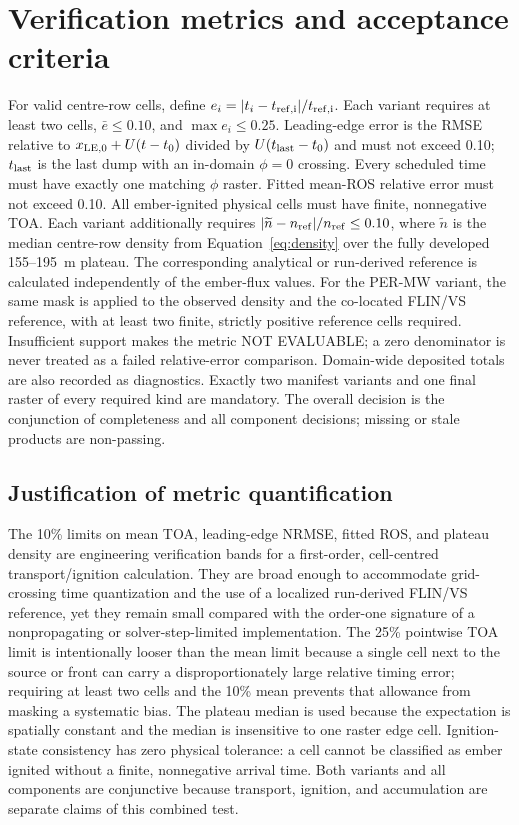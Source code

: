 \section{Verification metrics and acceptance criteria}
For valid centre-row cells, define $e_i=|t_i-t_{\rm ref,i}|/t_{\rm ref,i}$.
Each variant requires at least two cells, $\bar e\le0.10$, and
$\max e_i\le0.25$. Leading-edge error is the RMSE relative to
$x_{\rm LE,0}+U(t-t_0)$ divided by $U(t_{\rm last}-t_0)$ and must not exceed
0.10; $t_{\rm last}$ is the last dump with an in-domain $\phi=0$ crossing.
Every scheduled time must have exactly one matching $\phi$ raster. Fitted mean-ROS relative
error must not exceed 0.10. All ember-ignited physical cells must have finite, nonnegative TOA.
Each variant additionally requires
$|\widetilde n-n_{\rm ref}|/n_{\rm ref}\le0.10$, where
$\widetilde n$ is the median centre-row density from Equation~\ref{eq:density}
over the fully developed 155--195~m plateau. The corresponding analytical or
run-derived reference is calculated independently of the ember-flux values.
For the PER-MW variant, the same mask is applied to the observed density and
the co-located FLIN/VS reference, with at least two finite, strictly positive
reference cells required. Insufficient support makes the metric NOT EVALUABLE;
a zero denominator is never treated as a failed relative-error comparison.
Domain-wide deposited totals are also recorded as diagnostics. Exactly two
manifest variants and one final raster of every required
kind are mandatory. The overall decision is the conjunction of completeness and
all component decisions; missing or stale products are non-passing.

\subsection{Justification of metric quantification}

The 10\% limits on mean TOA, leading-edge NRMSE, fitted ROS, and plateau
density are engineering verification bands for a first-order, cell-centred
transport/ignition calculation.  They are broad enough to accommodate
grid-crossing time quantization and the use of a localized run-derived FLIN/VS
reference, yet they remain small compared with the order-one signature of a
nonpropagating or solver-step-limited implementation.  The 25\% pointwise TOA
limit is intentionally looser than the mean limit because a single cell next
to the source or front can carry a disproportionately large relative timing
error; requiring at least two cells and the 10\% mean prevents that allowance
from masking a systematic bias.  The plateau median is used because the
expectation is spatially constant and the median is insensitive to one raster
edge cell.  Ignition-state consistency has zero physical tolerance: a cell
cannot be classified as ember ignited without a finite, nonnegative arrival
time.  Both variants and all components are conjunctive because transport,
ignition, and accumulation are separate claims of this combined test.

